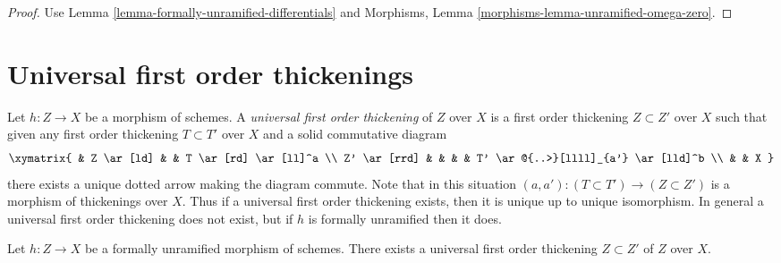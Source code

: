 \begin{proof}
Use Lemma \ref{lemma-formally-unramified-differentials} and
Morphisms, Lemma \ref{morphisms-lemma-unramified-omega-zero}.
\end{proof}









\section{Universal first order thickenings}
\label{section-universal-thickening}

\noindent
Let $h : Z \to X$ be a morphism of schemes. A {\it universal first order
thickening} of $Z$ over $X$ is a first order thickening $Z \subset Z'$
over $X$ such that given any first order thickening $T \subset T'$
over $X$ and a solid commutative diagram
$$
\xymatrix{
& Z \ar[ld] & & T \ar[rd] \ar[ll]^a \\
Z' \ar[rrd] & & & & T' \ar@{..>}[llll]_{a'} \ar[lld]^b \\
 & & X
}
$$
there exists a unique dotted arrow making the diagram commute.
Note that in this situation $(a, a') : (T \subset T') \to (Z \subset Z')$
is a morphism of thickenings over $X$. Thus if a universal first order
thickening exists, then it is unique up to unique isomorphism.
In general a universal first order thickening
does not exist, but if $h$ is formally unramified then it does.

\begin{lemma}
\label{lemma-universal-thickening}
Let $h : Z \to X$ be a formally unramified morphism of schemes.
There exists a universal first order thickening $Z \subset Z'$ of
$Z$ over $X$.
\end{lemma}

